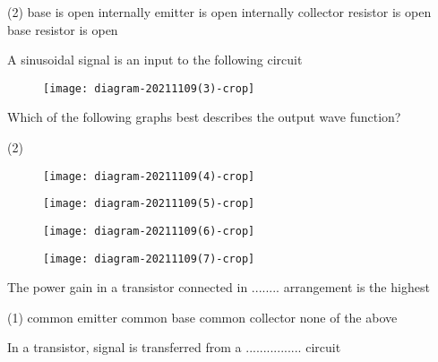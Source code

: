 \begin{enumerate}
\begin{minipage}{\textwidth}
\end{minipage}
\begin{tasks}(2)
	\task[\textbf{A.}]base is open internally 
	\task[\textbf{B.}] emitter is open internally
	\task[\textbf{C.}]collector resistor is open
	\task[\textbf{D.}]base resistor is open
\end{tasks}
\begin{minipage}{\textwidth}
	\item A sinusoidal signal is an input to the following circuit\\
\begin{figure}[H]
	\centering
	\texttt{[image: diagram-20211109(3)-crop]}
\end{figure}
	Which of the following graphs best describes the output wave function?
\end{minipage}
\begin{tasks}(2)
	\task[\textbf{A.}]\begin{figure}[H]
		\centering
		\texttt{[image: diagram-20211109(4)-crop]}
	\end{figure}
	\task[\textbf{B.}] \begin{figure}[H]
		\centering
		\texttt{[image: diagram-20211109(5)-crop]}
	\end{figure}
	\task[\textbf{C.}]\begin{figure}[H]
		\centering
		\texttt{[image: diagram-20211109(6)-crop]}
	\end{figure}
	\task[\textbf{D.}]\begin{figure}[H]
		\centering
		\texttt{[image: diagram-20211109(7)-crop]}
	\end{figure}
\end{tasks}
\begin{minipage}{\textwidth}
	\item  The power gain in a transistor connected in ........
	arrangement is the highest
\end{minipage}
\begin{tasks}(1)
	\task[\textbf{A.}]common emitter 
	\task[\textbf{B.}] common base
	\task[\textbf{C.}]common collector
	\task[\textbf{D.}]	none of the above
\end{tasks}
\begin{minipage}{\textwidth}
	\item  In a transistor, signal is transferred from a ................
	circuit
	    

\end{minipage}
\end{enumerate}
